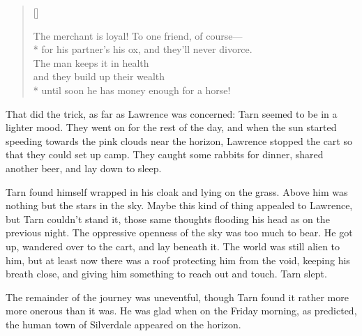 \begin{verse}[\versewidth]
\begin{patverse*}
The merchant is loyal!  To one friend, of course---\\*
for his partner's his ox, and they'll never divorce.\\
The man keeps it in health\\
and they build up their wealth\\*
until soon he has money enough for a horse!
\end{patverse*}
\end{verse}

That did the trick, as far as Lawrence was concerned: Tarn seemed to be in a lighter mood.  They went on for the rest of the day, and when the sun started speeding towards the pink clouds near the horizon, Lawrence stopped the cart so that they could set up camp.  They caught some rabbits for dinner, shared another beer, and lay down to sleep.

Tarn found himself wrapped in his cloak and lying on the grass.  Above him was nothing but the stars in the sky.  Maybe this kind of thing appealed to Lawrence, but Tarn couldn't stand it, those same thoughts flooding his head as on the previous night.  The oppressive openness of the sky was too much to bear.  He got up, wandered over to the cart, and lay beneath it.  The world was still alien to him, but at least now there was a roof protecting him from the void, keeping his breath close, and giving him something to reach out and touch.  Tarn slept.

The remainder of the journey was uneventful, though Tarn found it rather more more onerous than it was.  He was glad when on the Friday morning, as predicted, the human town of Silverdale appeared on the horizon.